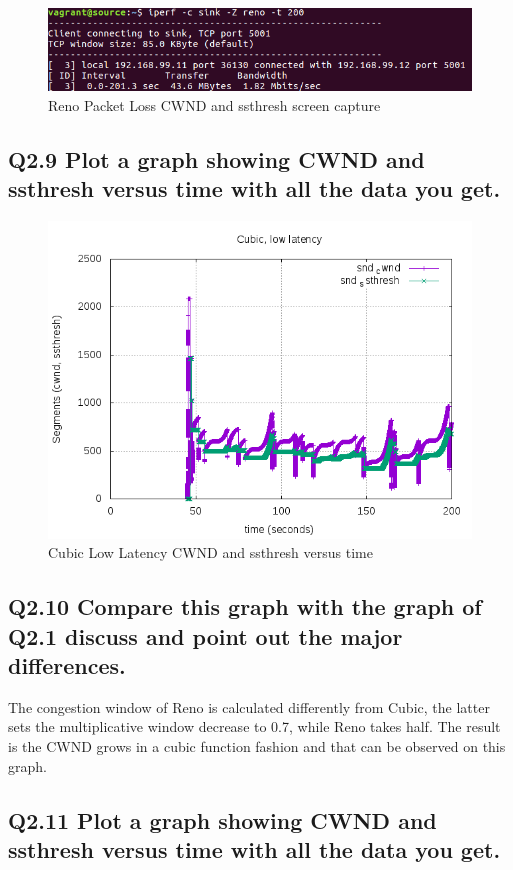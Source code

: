 \documentclass{article}
\begin{document}
\begin{figure}[H]
\centering
\includegraphics[width=12cm]{figures/renoScreenCapture.png}
\caption{Reno Packet Loss CWND and ssthresh screen capture}
\end{figure}

\subsection{Q2.9 Plot a graph showing CWND and ssthresh versus time with
all the data you get.}

\begin{figure}[H]
\centering
\includegraphics[width=12cm]{figures/CubicLLcwnd.png}
\caption{Cubic Low Latency CWND and ssthresh versus time}
\end{figure}

\subsection{Q2.10 Compare this graph with the graph of Q2.1 discuss and point out the major differences.}

The congestion window of Reno is calculated differently from Cubic, the latter sets the multiplicative window decrease to 0.7, while Reno takes half. The result is the CWND grows in a cubic function fashion and that can be observed on this graph.

\subsection{Q2.11 Plot a graph showing CWND and ssthresh versus time
with all the data you get.}
\end{document}
